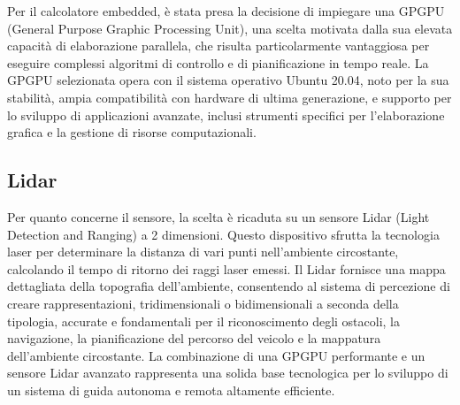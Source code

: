\noindent Per il calcolatore embedded, è stata presa la decisione di impiegare una GPGPU (General Purpose Graphic Processing Unit), una scelta motivata dalla sua elevata capacità di elaborazione parallela, che risulta particolarmente vantaggiosa per eseguire complessi algoritmi di controllo e di pianificazione in tempo reale. La GPGPU selezionata opera con il sistema operativo Ubuntu 20.04, noto per la sua stabilità, ampia compatibilità con hardware di ultima generazione, e supporto per lo sviluppo di applicazioni avanzate, inclusi strumenti specifici per l'elaborazione grafica e la gestione di risorse computazionali.

\subsection{Lidar}
Per quanto concerne il sensore, la scelta è ricaduta su un sensore Lidar (Light Detection and Ranging) a 2 dimensioni. Questo dispositivo sfrutta la tecnologia laser per determinare la distanza di vari punti nell'ambiente circostante, calcolando il tempo di ritorno dei raggi laser emessi. Il Lidar fornisce una mappa dettagliata della topografia dell'ambiente, consentendo al sistema di percezione di creare rappresentazioni, tridimensionali o bidimensionali a seconda della tipologia, accurate e fondamentali per il riconoscimento degli ostacoli, la navigazione, la pianificazione del percorso del veicolo e la mappatura dell'ambiente circostante. La combinazione di una GPGPU performante e un sensore Lidar avanzato rappresenta una solida base tecnologica per lo sviluppo di un sistema di guida autonoma e remota altamente efficiente.

